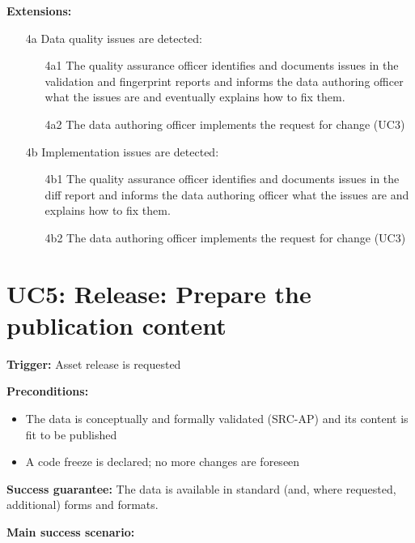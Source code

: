 	\textbf{Extensions:}
	
	\begin{enumerate}
		\item [4a] Data quality issues are detected:
		\begin{enumerate}
			\item [4a1] The quality assurance officer identifies  and documents issues in the validation and fingerprint reports and informs the data authoring officer what the issues are and eventually explains how to fix them.
			\item [4a2] The data authoring officer implements the request for change (UC3)			
		\end{enumerate}
		\item [4b] Implementation issues are detected:
		\begin{enumerate}
			\item [4b1] The quality assurance officer identifies and documents issues in the diff report and informs the data authoring officer what the issues are and explains how to fix them.
			\item [4b2] The data authoring officer implements the request for change (UC3)			
		\end{enumerate}
	\end{enumerate}


	\section{UC5: Release: Prepare the publication content}
	\label{sec:uc5}
	\textbf{Trigger:} Asset release is requested
	
	\textbf{Preconditions:} 
	\begin{itemize}
		\item The data is conceptually and formally validated (SRC-AP) and its content is fit to be published
		\item A code freeze is declared; no more changes are foreseen
	\end{itemize}
	
	\textbf{Success guarantee:} The data is available in standard (and, where requested, additional) forms and formats.
	
	\textbf{Main success scenario:}
	
